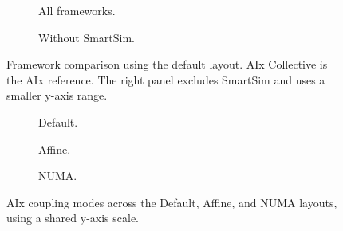 \documentclass[a4paper]{article}
\begin{document}
\begin{figure}[htbp]
  \centering
  \captionsetup[subfigure]{position=top,skip=-6pt}
  \begin{subfigure}[t]{0.49\textwidth}
    \centering
    \caption{All frameworks.}
    \label{fig:scaling-frameworks:all}
  \end{subfigure}\hfill
  \begin{subfigure}[t]{0.49\textwidth}
    \centering
    \caption{Without SmartSim.}
    \label{fig:scaling-frameworks:without-smartsim}
  \end{subfigure}
  \par\medskip
  \caption{Framework comparison using the default layout. AIx Collective
    is the AIx reference. The right panel excludes SmartSim and uses a
    smaller y-axis range.}
  \label{fig:scaling-frameworks}
\end{figure}

\begin{figure}[htbp]
  \centering
  \captionsetup[subfigure]{position=top,skip=-6pt}
  \begin{subfigure}[t]{0.40\textwidth}
    \centering
    \caption{Default.}
    \label{fig:scaling-aix-layouts:default}
  \end{subfigure}%
  \begin{subfigure}[t]{0.30\textwidth}
    \centering
    \caption{Affine.}
    \label{fig:scaling-aix-layouts:affine}
  \end{subfigure}%
  \begin{subfigure}[t]{0.30\textwidth}
    \centering
    \caption{NUMA.}
    \label{fig:scaling-aix-layouts:numa}
  \end{subfigure}
  \par\medskip
  \caption{AIx coupling modes across the Default, Affine, and NUMA layouts,
    using a shared y-axis scale.}
  \label{fig:scaling-aix-layouts}
\end{figure}
\end{document}
